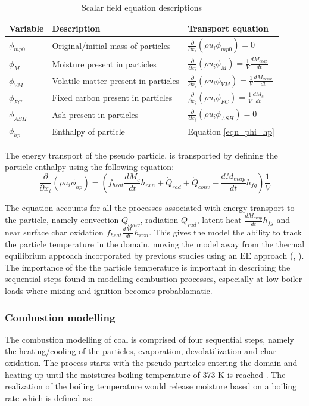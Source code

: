 \documentclass{webofc}
\begin{document}
\begin{table}[h!]
\centering
\caption{Scalar field equation descriptions}\label{tab_scalars}       
\begin{tabular}{lll}
\hline
Variable &Description& Transport equation \\
\hline
$\phi_{mp0}$ &Original/initial mass of particles& $\frac{\partial}{\partial x_{i}}(\rho u_{i} \phi_{mp0})=0$\\
$\phi_{M}$&Moisture present in particles&$\frac{\partial}{\partial x_{i}}(\rho u_{i} \phi_{M})=\frac{1}{V} \frac{dM_{evap}}{dt}$\\
$\phi_{VM}$&Volatile matter present in particles&  $\frac{\partial}{\partial x_{i}}(\rho u_{i} \phi_{VM})=\frac{1}{V}\frac{dM_{devol}}{dt}$\\
$\phi_{FC}$&Fixed carbon present in particles&$\frac{\partial}{\partial x_{i}}(\rho u_{i} \phi_{FC})=\frac{1}{V}\frac{dM_c}{dt}$\\
$\phi_{ASH}$&Ash present in particles&$\frac{\partial}{\partial x_{i}}(\rho u_{i} \phi_{ASH})=0$\\
$\phi_{hp}$&Enthalpy of particle&Equation \ref{eqn_phi_hp}\\
\hline
\end{tabular}
\end{table}

The energy transport of the pseudo particle, is transported by defining the particle enthalpy using the following equation:
\begin{equation}\label{eqn_phi_hp}
\frac{\partial}{\partial x_{i}}(\rho u_{i} \phi_{hp})=\left(f_{heat}\frac{dM_{c}}{dt}h_{rxn} + \dot{Q}_{rad} + \dot{Q}_{conv} - \frac{dM_{evap}}{dt}h_{fg}\right)\frac{1}{V}
\end{equation}

The equation accounts for all the processes associated with energy transport to the particle, namely convection $\dot{Q}_{conv}$, radiation $\dot{Q}_{rad}$, latent heat $\frac{dM_{evap}}{dt}h_{fg}$ and near surface char oxidation $f_{heat}\frac{dM_{c}}{dt}h_{rxn}$. This gives the model the ability to track the particle temperature in the domain, moving the model away from the thermal equilibrium approach incorporated by previous studies using an EE approach (\cite{epple}, \cite{knaus}). The importance of the the particle temperature is important in describing the sequential steps found in modelling combustion processes, especially at low boiler loads where mixing and ignition becomes probablamatic.

\subsubsection{Combustion modelling}
The combustion modelling of coal is comprised of four sequential steps, namely the heating/cooling of the particles, evaporation, devolatilization and char oxidation. The process starts with the pseudo-particles entering the domain and heating up until the moistures boiling temperature of 373 K is reached \cite{cengel}. The realization of the boiling temperature would release moisture based on a boiling rate which is defined as:
\end{document}
